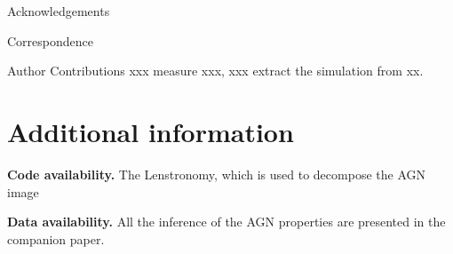 \documentclass{natureprintstyle}
\newcommand{\lenstronomy}{{\sc Lenstronomy}}
\begin{document}
\begin{addendum}
 \item[Acknowledgements] 

%
\item[Correspondence] %
\item[Author Contributions] xxx measure xxx, xxx extract the simulation from xx.
\end{addendum}

\section*{Additional information}
\textbf{Code availability.} The \lenstronomy, which is used to decompose the AGN image  

\textbf{Data availability.} All the inference of the AGN properties are presented in the companion paper.




%
%
\end{document}
